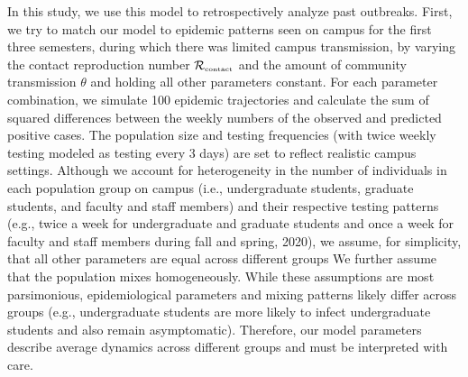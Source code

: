 \documentclass[12pt]{article}
\newcommand{\Rx}[1]{\ensuremath{{\mathcal R}_{#1}}}
\newcommand{\Rc}{\Rx{\textrm{\tiny{contact}}}}
\begin{document}
In this study, we use this model to retrospectively analyze past outbreaks.
First, we try to match our model to epidemic patterns seen on campus for the first three semesters, during which there was limited campus transmission, by varying the contact reproduction number $\Rc$ and the amount of community transmission $\theta$ and holding all other parameters constant.
For each parameter combination, we simulate 100 epidemic trajectories and calculate the sum of squared differences between the weekly numbers of the observed and predicted positive cases.
The population size and testing frequencies (with twice weekly testing modeled as testing every 3 days) are set to reflect realistic campus settings.
Although we account for heterogeneity in the number of individuals in each population group on campus (i.e., undergraduate students, graduate students, and faculty and staff members) and their respective testing patterns (e.g., twice a week for undergraduate and graduate students and once a week for faculty and staff members during fall and spring, 2020), we assume, for simplicity, that all other parameters are equal across different groups 
We further assume that the population mixes homogeneously.
While these assumptions are most parsimonious, epidemiological parameters and mixing patterns likely differ across groups (e.g., undergraduate students are more likely to infect undergraduate students and also remain asymptomatic).
Therefore, our model parameters describe average dynamics across different groups and must be interpreted with care.
\end{document}
